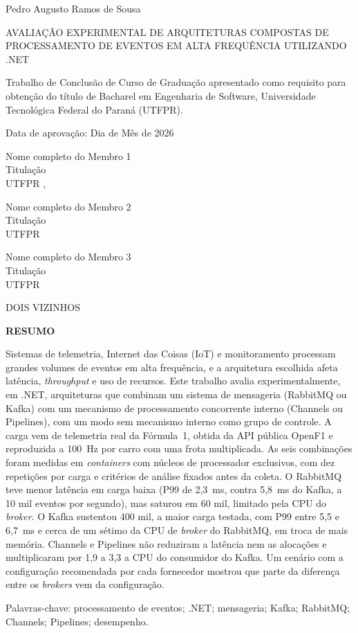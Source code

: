 \documentclass[12pt]{article}
\newcommand{\autor}{Pedro Augusto Ramos de Sousa}
\newcommand{\titulo}{Avaliação Experimental de Arquiteturas Compostas de Processamento de Eventos em Alta Frequência Utilizando .NET}
\newcommand{\tituloUppercase}{\MakeUppercase{\titulo}}
\newcommand{\textoResumo}{Sistemas de telemetria, Internet das Coisas (IoT) e monitoramento processam grandes volumes de eventos em alta frequência, e a arquitetura escolhida afeta latência, \textit{throughput} e uso de recursos. Este trabalho avalia experimentalmente, em .NET, arquiteturas que combinam um sistema de mensageria (RabbitMQ ou Kafka) com um mecanismo de processamento concorrente interno (Channels ou Pipelines), com um modo sem mecanismo interno como grupo de controle. A carga vem de telemetria real da Fórmula~1, obtida da API pública OpenF1 e reproduzida a 100~Hz por carro com uma frota multiplicada. As seis combinações foram medidas em \textit{containers} com núcleos de processador exclusivos, com dez repetições por carga e critérios de análise fixados antes da coleta. O RabbitMQ teve menor latência em carga baixa (P99 de 2,3~ms, contra 5,8~ms do Kafka, a 10 mil eventos por segundo), mas saturou em 60 mil, limitado pela CPU do \textit{broker}. O Kafka sustentou 400 mil, a maior carga testada, com P99 entre 5,5 e 6,7~ms e cerca de um sétimo da CPU de \textit{broker} do RabbitMQ, em troca de mais memória. Channels e Pipelines não reduziram a latência nem as alocações e multiplicaram por 1,9 a 3,3 a CPU do consumidor do Kafka. Um cenário com a configuração recomendada por cada fornecedor mostrou que parte da diferença entre os \textit{brokers} vem da configuração.}
\newcommand{\datadeaprovacao}{Dia de Mês de 2026}
\newcommand{\ano}{\the\year{}}
\newcommand{\membroUm}{Nome completo do Membro 1}
\newcommand{\titulacaoMembroUm}{Titulação}
\newcommand{\instituicaoMembroUm}{UTFPR}
\newcommand{\membroDois}{Nome completo do Membro 2}
\newcommand{\titulacaoMembroDois}{Titulação}
\newcommand{\instituicaoMembroDois}{UTFPR}
\newcommand{\membroTres}{Nome completo do Membro 3}
\newcommand{\titulacaoMembroTres}{Titulação}
\newcommand{\instituicaoMembroTres}{UTFPR}
\begin{document}
\begin{titlepage}
\centering
{\large \autor \par}
\vspace{1.5cm}
{\large \tituloUppercase \par}
\vspace{2cm}
\hfill
\parbox[t]{8cm}{
Trabalho de Conclusão de Curso de Graduação apresentado como requisito para obtenção do
título de Bacharel em Engenharia de Software, Universidade Tecnológica Federal do Paraná
(UTFPR). \par
}

\vspace{1.5cm}
{Data de aprovação: \datadeaprovacao \par}
\vspace{1.5cm}
\hrulefill
\vspace{-0.3cm}

{\membroUm}\\
{\titulacaoMembroUm}\\
{\instituicaoMembroUm}
\vspace{1cm},

\hrulefill
\vspace{-0.3cm}

{\membroDois}\\
{\titulacaoMembroDois}\\
{\instituicaoMembroDois}\\
\vspace{1cm}

\hrulefill
\vspace{-0.3cm}

{\membroTres}\\
{\titulacaoMembroTres}\\
{\instituicaoMembroTres}\\

\vspace*{\fill}
{\large DOIS VIZINHOS \par}
{\large \ano \par}
\end{titlepage}

\newpage
\pagestyle{empty}

\centering
{\textbf{RESUMO} \par}
\vspace{1cm}
\justifying
\noindent
\textoResumo

\noindent
Palavras-chave: processamento de eventos; .NET; mensageria; Kafka; RabbitMQ; Channels; Pipelines; desempenho.
\vspace{1cm}
\end{document}

